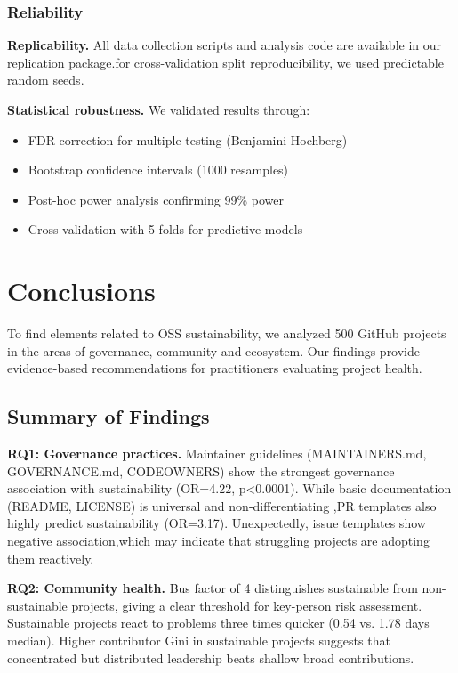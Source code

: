 \documentclass[conference]{IEEEtran}
\begin{document}
\subsubsection{Reliability}

\textbf{Replicability.} All data collection scripts and analysis code are available in our replication package.for cross-validation split reproducibility, we used predictable random seeds.

\textbf{Statistical robustness.} We validated results through:
\begin{itemize}
    \item FDR correction for multiple testing (Benjamini-Hochberg)
    \item Bootstrap confidence intervals (1000 resamples)
    \item Post-hoc power analysis confirming 99\% power
    \item Cross-validation with 5 folds for predictive models
\end{itemize}

\section{Conclusions}

To find elements related to OSS sustainability, we analyzed 500 GitHub projects in the areas of governance, community and ecosystem. Our findings provide evidence-based recommendations for practitioners evaluating project health.

\subsection{Summary of Findings}

\textbf{RQ1: Governance practices.} Maintainer guidelines (MAINTAINERS.md, GOVERNANCE.md, CODEOWNERS) show the strongest governance association with sustainability (OR=4.22, p<0.0001). While basic documentation (README, LICENSE) is universal and non-differentiating ,PR templates also highly predict sustainability (OR=3.17). Unexpectedly, issue templates show negative association,which may indicate that struggling projects are adopting them reactively.

\textbf{RQ2: Community health.} Bus factor of 4 distinguishes sustainable from non-sustainable projects, giving a clear threshold for key-person risk assessment. Sustainable projects react to problems three times quicker (0.54 vs. 1.78 days median). Higher contributor Gini in sustainable projects suggests that concentrated but distributed leadership beats shallow broad contributions.
\end{document}
